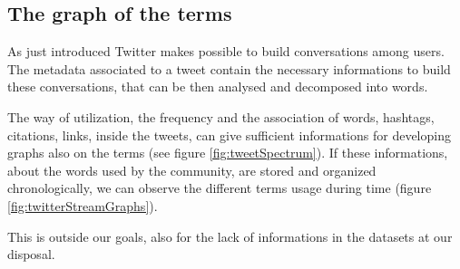 \documentclass[a4paper,11pt,oneside]{article}
\begin{document}
\subsection{The graph of the terms}
As just introduced Twitter makes possible to build conversations among users. The metadata associated to a tweet contain the necessary informations to build these conversations, that can be then analysed and decomposed into words.

The way of utilization, the frequency and the association of words, hashtags, citations, links, inside the tweets, can give sufficient informations for developing graphs also on the terms (see figure \ref{fig:tweetSpectrum}). If these informations, about the words used by the community, are stored and organized chronologically, we can observe the different terms usage during time (figure \ref{fig:twitterStreamGraphs}).

This is outside our goals, also for the lack of informations in the datasets at our disposal.
\end{document}
